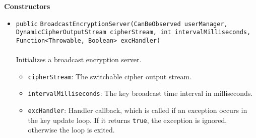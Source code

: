 \textbf{\sffamily Constructors}
\begin{itemize}
\item \lstinline|public| \lstinline|BroadcastEncryptionServer|\lstinline|(CanBeObserved userManager, DynamicCipherOutputStream cipherStream, int intervalMilliseconds, Function<Throwable, Boolean> excHandler)|\\ \\[-0.6em]
Initializes a broadcast encryption server.
\begin{itemize}
\item \lstinline|cipherStream|: The switchable cipher output stream.
\item \lstinline|intervalMilliseconds|: The key broadcast time interval in milliseconds.
\item \lstinline|excHandler|: Handler callback, which is called if an exception occurs in
                   the key update loop. If it returns \lstinline|true|, the
                   exception is ignored, otherwise the loop is exited.
\end{itemize}



\end{itemize}


